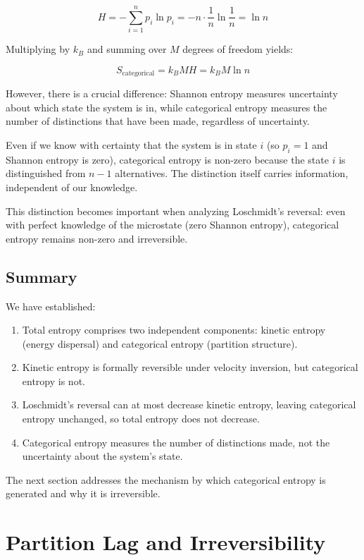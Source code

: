 \documentclass[twocolumn,10pt]{article}
\theoremstyle{definition}
\theoremstyle{remark}
\begin{document}
$$
H = -\sum_{i=1}^n p_i \ln p_i = -n \cdot \frac{1}{n} \ln\frac{1}{n} = \ln n
$$

Multiplying by $k_B$ and summing over $M$ degrees of freedom yields:

$$
S_{\text{categorical}} = k_B M H = k_B M \ln n
$$

However, there is a crucial difference: Shannon entropy measures uncertainty about which state the system is in, while categorical entropy measures the number of distinctions that have been made, regardless of uncertainty.

Even if we know with certainty that the system is in state $i$ (so $p_i = 1$ and Shannon entropy is zero), categorical entropy is non-zero because the state $i$ is distinguished from $n-1$ alternatives. The distinction itself carries information, independent of our knowledge.

This distinction becomes important when analyzing Loschmidt's reversal: even with perfect knowledge of the microstate (zero Shannon entropy), categorical entropy remains non-zero and irreversible.

\subsection{Summary}

We have established:

\begin{enumerate}
\item Total entropy comprises two independent components: kinetic entropy (energy dispersal) and categorical entropy (partition structure).

\item Kinetic entropy is formally reversible under velocity inversion, but categorical entropy is not.

\item Loschmidt's reversal can at most decrease kinetic entropy, leaving categorical entropy unchanged, so total entropy does not decrease.

\item Categorical entropy measures the number of distinctions made, not the uncertainty about the system's state.
\end{enumerate}

The next section addresses the mechanism by which categorical entropy is generated and why it is irreversible.

\section{Partition Lag and Irreversibility}
\label{sec:partition_lag}
\end{document}
